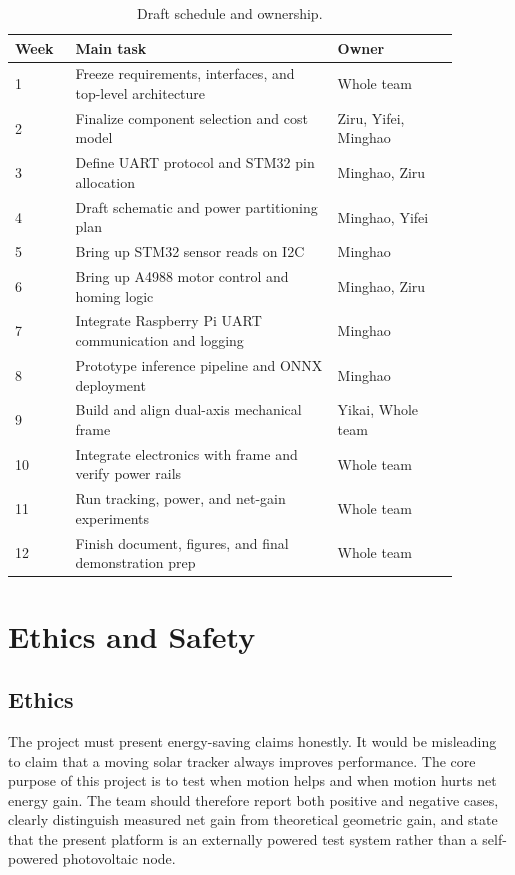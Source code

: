 \documentclass[11pt]{article}
\begin{document}
\begin{longtable}{p{0.12\linewidth} p{0.52\linewidth} p{0.24\linewidth}}
\caption{Draft schedule and ownership.\label{tab:schedule}}\\
\toprule
Week & Main task & Owner \\
\midrule
1 & Freeze requirements, interfaces, and top-level architecture & Whole team \\
2 & Finalize component selection and cost model & Ziru, Yifei, Minghao \\
3 & Define UART protocol and STM32 pin allocation & Minghao, Ziru \\
4 & Draft schematic and power partitioning plan & Minghao, Yifei \\
5 & Bring up STM32 sensor reads on I2C & Minghao \\
6 & Bring up A4988 motor control and homing logic & Minghao, Ziru \\
7 & Integrate Raspberry Pi UART communication and logging & Minghao \\
8 & Prototype inference pipeline and ONNX deployment & Minghao \\
9 & Build and align dual-axis mechanical frame & Yikai, Whole team \\
10 & Integrate electronics with frame and verify power rails & Whole team \\
11 & Run tracking, power, and net-gain experiments & Whole team \\
12 & Finish document, figures, and final demonstration prep & Whole team \\
\bottomrule
\end{longtable}

\section{Ethics and Safety}

\subsection{Ethics}
The project must present energy-saving claims honestly. It would be misleading to claim that a moving solar tracker always improves performance. The core purpose of this project is to test when motion helps and when motion hurts net energy gain. The team should therefore report both positive and negative cases, clearly distinguish measured net gain from theoretical geometric gain, and state that the present platform is an externally powered test system rather than a self-powered photovoltaic node.
\end{document}
